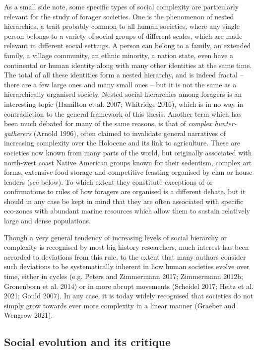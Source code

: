 \documentclass[
  12pt,
  a4paper, twoside]{book}
\begin{document}
As a small side note, some specific types of social complexity are particularly relevant for the study of forager societies. One is the phenomenon of nested hierarchies, a trait probably common to all human societies, where any single person belongs to a variety of social groups of different scales, which are made relevant in different social settings. A person can belong to a family, an extended family, a village community, an ethnic minority, a nation state, even have a continental or human identity along with many other identities at the same time. The total of all these identities form a nested hierarchy, and is indeed fractal -- there are a few large ones and many small ones -- but it is not the same as a hierarchically organised society. Nested social hierarchies among foragers is an interesting topic (Hamilton et al. 2007; Whitridge 2016), which is in no way in contradiction to the general framework of this thesis. Another term which has been much debated for many of the same reasons, is that of \emph{complex hunter-gatherers} (Arnold 1996), often claimed to invalidate general narratives of increasing complexity over the Holocene and its link to agriculture. These are societies now known from many parts of the world, but originally associated with north-west coast Native American groups known for their sedentism, complex art forms, extensive food storage and competitive feasting organised by clan or house leaders (see below). To which extent they constitute exceptions of or confirmations to rules of how foragers are organised is a different debate, but it should in any case be kept in mind that they are often associated with specific eco-zones with abundant marine resources which allow them to sustain relatively large and dense populations.

Though a very general tendency of increasing levels of social hierarchy or complexity is recognised by most big history researchers, much interest has been accorded to deviations from this rule, to the extent that many authors consider such deviations to be systematically inherent in how human societies evolve over time, either in cycles (e.g. Peters and Zimmermann 2017; Zimmermann 2012b; Gronenborn et al. 2014) or in more abrupt movements (Scheidel 2017; Heitz et al. 2021; Gould 2007). In any case, it is today widely recognised that societies do not simply grow towards ever more complexity in a linear manner (Graeber and Wengrow 2021).

\hypertarget{social-evolution-and-its-critique}{%
\subsection{Social evolution and its critique}\label{social-evolution-and-its-critique}}
\end{document}

